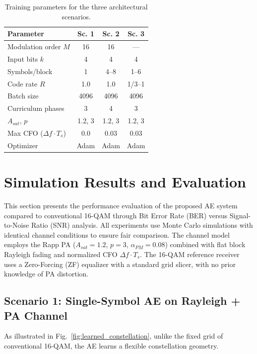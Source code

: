 \documentclass{JECnew}
\begin{document}
\begin{table}[H]
\caption{Training parameters for the three architectural scenarios.}
\label{tab:params}
\centering
\begin{tabular*}{\columnwidth}{@{\extracolsep{\fill}}lccc}
\toprule
\textbf{Parameter} & \textbf{Sc. 1} & \textbf{Sc. 2} & \textbf{Sc. 3} \\
\midrule
Modulation order $M$ & 16 & 16 & --- \\
Input bits $k$ & 4 & 4 & 4 \\
Symbols/block & 1 & 4--8 & 1--6 \\
Code rate $R$ & 1.0 & 1.0 & 1/3--1 \\
Batch size & 4096 & 4096 & 4096 \\
Curriculum phases & 3 & 4 & 3 \\
$A_{sat}$, $p$ & 1.2, 3 & {\color{blue}1.2, 3} & {\color{blue}1.2, 3} \\
Max CFO ($\Delta f \cdot T_s$) & {\color{blue}0.0} & 0.03 & 0.03 \\
Optimizer & Adam & Adam & Adam \\
\bottomrule
\end{tabular*}
\end{table}

\section{Simulation Results and Evaluation}

This section presents the performance evaluation of the proposed AE system compared to conventional 16-QAM through Bit Error Rate (BER) versus Signal-to-Noise Ratio (SNR) analysis. All experiments use Monte Carlo simulations with identical channel conditions to ensure fair comparison. {\color{blue}The channel model employs the Rapp PA ($A_{sat} = 1.2$, $p = 3$, $\alpha_{PM} = 0.08$) combined with flat block Rayleigh fading and normalized CFO $\Delta f \cdot T_s$. The 16-QAM reference receiver uses a Zero-Forcing (ZF) equalizer with a standard grid slicer, with no prior knowledge of PA distortion.}

\subsection{Scenario 1: Single-Symbol AE on Rayleigh + PA Channel}

As illustrated in Fig.~\ref{fig:learned_constellation}, unlike the fixed grid of conventional 16-QAM, the AE learns a flexible constellation geometry.
\end{document}
